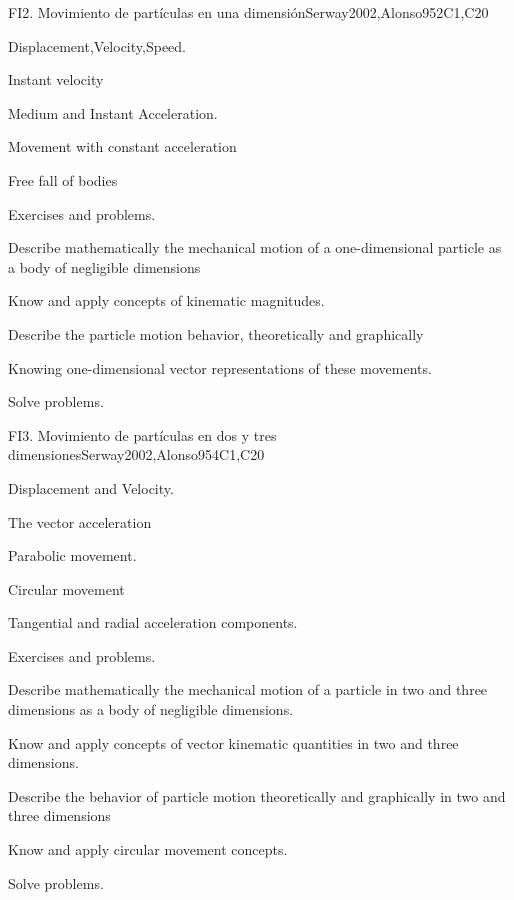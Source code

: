 \begin{syllabus}
\begin{unit}{FI2. Movimiento de partículas en una dimensión}{}{Serway2002,Alonso95}{2}{C1,C20}
\begin{topics}
      \item Displacement,Velocity,Speed.
      \item Instant velocity
      \item Medium and Instant Acceleration.
      \item Movement with constant acceleration
      \item Free fall of bodies
      \item Exercises and problems.
    \end{topics}
   \begin{learningoutcomes}
      \item Describe mathematically the mechanical motion of a one-dimensional particle as a body of negligible dimensions
      \item Know and apply concepts of kinematic magnitudes.
      \item Describe the particle motion behavior, theoretically and graphically
      \item Knowing one-dimensional vector representations of these movements.
      \item Solve problems.
   \end{learningoutcomes}
\end{unit}

\begin{unit}{FI3. Movimiento de partículas en dos y tres dimensiones}{}{Serway2002,Alonso95}{4}{C1,C20}
\begin{topics}
      \item Displacement and Velocity.
      \item The vector acceleration
      \item Parabolic movement.
      \item Circular movement
      \item Tangential and radial acceleration components.
      \item Exercises and problems.
\end{topics}

   \begin{learningoutcomes}
      \item Describe mathematically the mechanical motion of a particle in two and three dimensions as a body of negligible dimensions.
      \item Know and apply concepts of vector kinematic quantities in two and three dimensions.
      \item Describe the behavior of particle motion theoretically and graphically in two and three dimensions
      \item Know and apply circular movement concepts.
      \item Solve problems.
   \end{learningoutcomes}
\end{unit}


\end{syllabus}
